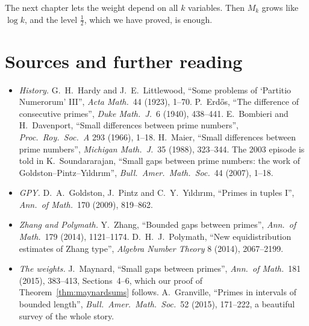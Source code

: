 The next chapter lets the weight depend on all $k$ variables. Then $M_k$ grows like $\log k$, and the level $\frac12$, which we have proved, is enough.

\section*{Sources and further reading}

\begin{itemize}
\item \emph{History.} G.~H.~Hardy and J.~E.~Littlewood, ``Some problems of `Partitio Numerorum' III'', \emph{Acta Math.}\ 44 (1923), 1--70. P.~Erdős, ``The difference of consecutive primes'', \emph{Duke Math.\ J.}\ 6 (1940), 438--441. E.~Bombieri and H.~Davenport, ``Small differences between prime numbers'', \emph{Proc.\ Roy.\ Soc.\ A} 293 (1966), 1--18. H.~Maier, ``Small differences between prime numbers'', \emph{Michigan Math.\ J.}\ 35 (1988), 323--344. The 2003 episode is told in K.~Soundararajan, ``Small gaps between prime numbers: the work of Goldston--Pintz--Yıldırım'', \emph{Bull.\ Amer.\ Math.\ Soc.}\ 44 (2007), 1--18.
\item \emph{GPY.} D.~A.~Goldston, J.~Pintz and C.~Y.~Yıldırım, ``Primes in tuples I'', \emph{Ann.\ of Math.}\ 170 (2009), 819--862.
\item \emph{Zhang and Polymath.} Y.~Zhang, ``Bounded gaps between primes'', \emph{Ann.\ of Math.}\ 179 (2014), 1121--1174. D.~H.~J.~Polymath, ``New equidistribution estimates of Zhang type'', \emph{Algebra Number Theory} 8 (2014), 2067--2199.
\item \emph{The weights.} J.~Maynard, ``Small gaps between primes'', \emph{Ann.\ of Math.}\ 181 (2015), 383--413, Sections~4--6, which our proof of Theorem~\ref{thm:maynardsums} follows. A.~Granville, ``Primes in intervals of bounded length'', \emph{Bull.\ Amer.\ Math.\ Soc.}\ 52 (2015), 171--222, a beautiful survey of the whole story.
\end{itemize}
